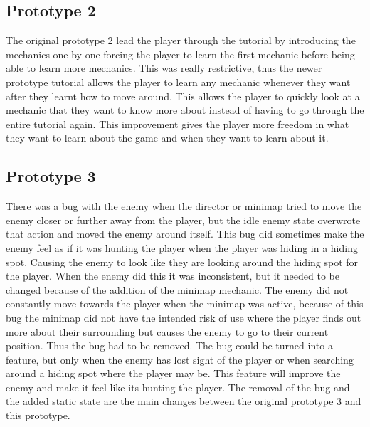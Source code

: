 \documentclass{article}
\begin{document}
\subsection{Prototype 2}
The original prototype 2 lead the player through the tutorial by introducing the mechanics one by one forcing the player
to learn the first mechanic before being able to learn more mechanics. This was really restrictive, thus the newer prototype
tutorial allows the player to learn any mechanic whenever they want after they learnt how to move around. This allows the 
player to quickly look at a mechanic that they want to know more about instead of having to go through the entire tutorial
again. This improvement gives the player more freedom in what they want to learn about the game and when they want to learn
about it. 
\subsection{Prototype 3}
There was a bug with the enemy when the director or minimap tried to move the enemy closer or further away from the 
player, but the idle enemy state overwrote that action and moved the enemy around itself.
This bug did sometimes make the enemy feel as if it was hunting the player when the player was hiding in a hiding spot.
Causing the enemy to look like they are looking around the hiding spot for the player. When the enemy did this it was 
inconsistent, but it needed to be changed because of the addition of the minimap mechanic. The enemy did not 
constantly move towards the player when the minimap was active, because of this bug the minimap did not have the
intended risk of use where the player finds out more about their surrounding but causes the enemy to go to their
current position. Thus the bug had to be removed.
The bug could be turned into a feature, but only when the enemy has lost sight of the player or when searching
around a hiding spot where the player may be. This feature will improve the enemy and make it feel like its 
hunting the player. The removal of the bug and the added static state are the main changes between the original
prototype 3 and this prototype.
\end{document}
